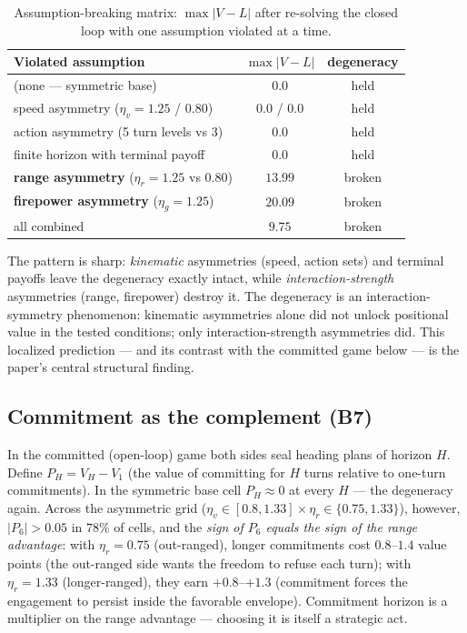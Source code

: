 \documentclass[12pt,a4paper]{article}
\newcommand{\etav}{\eta_v}
\newcommand{\etar}{\eta_r}
\newcommand{\etag}{\eta_g}
\begin{document}
\begin{table}[!htb]
\centering\small
\caption{Assumption-breaking matrix: $\max|V-L|$ after re-solving the
closed loop with one assumption violated at a time.}
\label{tab:b3}
\begin{tabular}{lcc}
\toprule
Violated assumption & $\max|V-L|$ & degeneracy \\
\midrule
(none --- symmetric base) & $0.0$ & held \\
speed asymmetry ($\etav=1.25$ / $0.80$) & $0.0$ / $0.0$ & held \\
action asymmetry (5 turn levels vs 3) & $0.0$ & held \\
finite horizon with terminal payoff & $0.0$ & held \\
\textbf{range asymmetry} ($\etar=1.25$ vs $0.80$) & $\mathbf{13.99}$ & broken \\
\textbf{firepower asymmetry} ($\etag=1.25$) & $\mathbf{20.09}$ & broken \\
all combined & $9.75$ & broken \\
\bottomrule
\end{tabular}
\end{table}

The pattern is sharp: \emph{kinematic} asymmetries (speed, action sets) and
terminal payoffs leave the degeneracy exactly intact, while
\emph{interaction-strength} asymmetries (range, firepower) destroy it.  The
degeneracy is an interaction-symmetry phenomenon: kinematic asymmetries alone did not unlock
positional value in the tested conditions; only interaction-strength
asymmetries did.  This
localized prediction --- and its contrast with the committed game below ---
is the paper's central structural finding.

\subsection{Commitment as the complement (B7)}\label{sec:commitment}

In the committed (open-loop) game both sides seal heading plans of horizon
$H$.  Define $P_H=V_H-V_1$ (the value of committing for $H$ turns relative
to one-turn commitments).  In the symmetric base cell $P_H\approx0$ at
every $H$ --- the degeneracy again.  Across the asymmetric grid
($\etav\in[0.8,1.33]\times\etar\in\{0.75,1.33\}$), however,
$|P_6|>0.05$ in $78\%$ of cells, and the \emph{sign of $P_6$ equals the
sign of the range advantage}: with $\etar=0.75$ (out-ranged), longer
commitments cost $0.8$--$1.4$ value points (the out-ranged side wants the
freedom to refuse each turn); with $\etar=1.33$ (longer-ranged), they earn
$+0.8$--$+1.3$ (commitment forces the engagement to persist inside the
favorable envelope).  Commitment horizon is a multiplier on the range
advantage --- choosing it is itself a strategic act.
\end{document}
